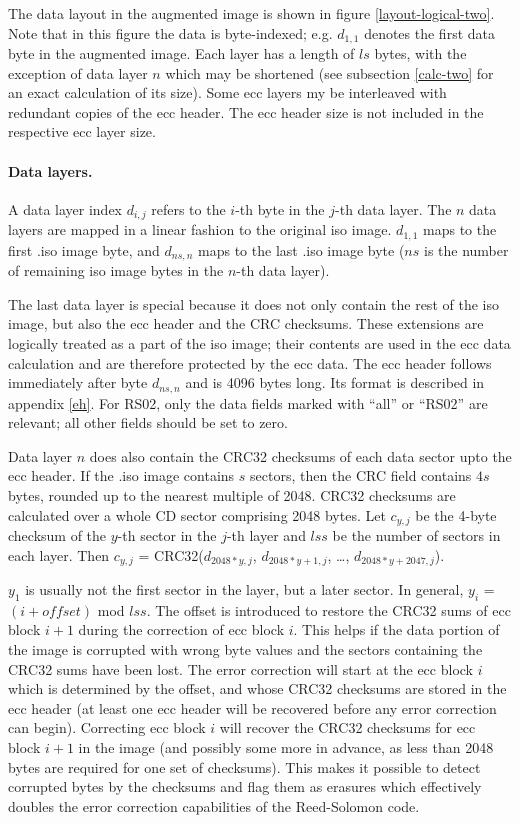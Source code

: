 The data layout in the augmented image is shown in figure \ref{layout-logical-two}.
Note that in this figure the data is byte-indexed; e.g. $d_{1,1}$ denotes the
first data byte in the augmented image. Each layer has a length of
$ls$ bytes, with the exception of data layer $n$ which may be shortened (see subsection \ref{calc-two} for an exact calculation of its size). 
Some ecc layers my be interleaved with redundant copies of the ecc header. 
The ecc header size is not included in the respective ecc layer size.

\paragraph{Data layers.} A data layer index $d_{i,j}$ refers to the $i$-th byte in the $j$-th data layer.
The $n$ data layers are mapped in a linear fashion to the original iso image.
$d_{1,1}$ maps to the first .iso image byte, and $d_{ns,n}$ maps to the last .iso image
byte ($ns$ is the number of remaining iso image bytes in the $n$-th data layer). 

The last data layer is special because it does not only contain the rest of the iso image,
but also the ecc header and the CRC checksums. These extensions 
are logically treated as a part of the iso image; their contents are used in the
ecc data calculation and are therefore protected by the ecc data.
The ecc header follows immediately after byte $d_{ns,n}$ and is 4096 bytes long.
Its format is described in appendix \ref{eh}. For RS02, only the data fields
marked with ``all'' or ``RS02'' are relevant; all other fields should be set to zero.

Data layer $n$ does also contain the CRC32 checksums of each data sector
upto the ecc header. If the .iso image contains $s$ sectors, 
then the CRC field contains $4s$ bytes, rounded up
to the nearest multiple of 2048. 
CRC32 checksums are calculated over a whole CD sector comprising 2048 bytes.
Let $c_{y,j}$ be the 4-byte checksum of the $y$-th sector in the $j$-th layer
and $lss$ be the number of sectors in each layer.
Then $c_{y,j}$ = CRC32($d_{2048*y,j}$, $d_{2048*y+1,j}$, \dots, $d_{2048*y+2047,j}$).  
 
$y_1$ is usually not the first sector in the layer, but a later sector.
In general, $y_i$ = $(i+offset)$ mod $lss$. The offset is introduced to restore
the CRC32 sums of ecc block $i+1$ during the correction of ecc block $i$.
This helps if the data portion of the image is corrupted with wrong byte values and
the sectors containing the CRC32 sums have been lost. 
The error correction will start at the ecc block $i$ which is determined
by the offset, and whose CRC32 checksums are stored in the ecc header (at least one
ecc header will be recovered before any error correction can begin). Correcting
ecc block $i$ will recover the CRC32 checksums for ecc block $i+1$ in the image
(and possibly some more in advance, as less than 2048 bytes are required for
one set of checksums). This makes it possible to detect corrupted bytes by the
checksums and flag them as erasures which effectively doubles the error correction
capabilities of the Reed-Solomon code.

